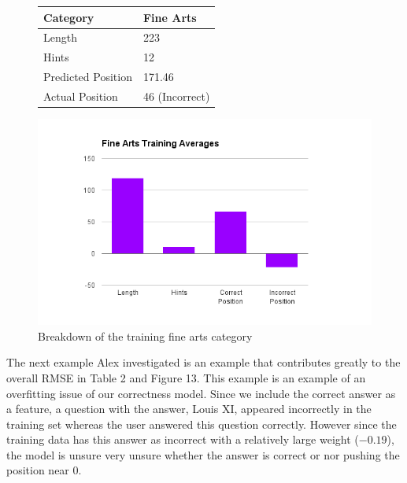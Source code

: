 \documentclass[letterpaper]{article}
\begin{document}
\begin{figure}[H]
\centering
\begin{minipage}[t]{.4\textwidth}
\centering
\vspace{0pt}

\begin{tabular}{|l|l |}
\hline
Category & Fine Arts \\ \hline
Length &  223 \\
Hints & 12 \\
Predicted Position & 171.46 \\
Actual Position & 46 (Incorrect) \\ \hline

\end{tabular}
\label{table:ex_art}
\end{minipage}\hfill
\begin{minipage}[t]{.4\textwidth}
\centering
\vspace{0pt}
\includegraphics[width=\textwidth]{finearts.png}
\caption{Breakdown of the training fine arts category}
\label{fig:mircoFA}
\end{minipage}

\end{figure}

The next example Alex investigated is an example that contributes greatly to the overall RMSE in Table 2 and Figure 13.  This example is an example of an overfitting issue of our correctness model.  Since we include the correct answer as a feature, a question with the answer, Louis XI, appeared incorrectly in the training set whereas the user answered this question correctly.  However since the training data has this answer as incorrect with a relatively large weight ($-0.19$), the model is unsure very unsure whether the answer is correct or nor pushing the position near $0$. 
\end{document}
